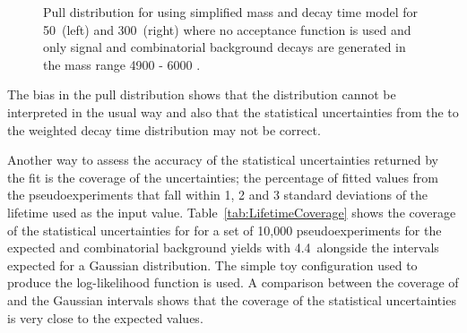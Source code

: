 {\begin{figure}[tbp]
\begin{subfigure}[b]{0.48\textwidth}
   \end{subfigure}
    \caption{Pull distribution for \tmumu using simplified mass and decay time model for 50~\fb (left) and 300~\fb (right) where no acceptance function is used and only signal and combinatorial background decays are generated in the mass range 4900 - 6000 \mevcc.}
    \label{fig:morestatstaupulls}
\end{figure}


The bias in the \tmumu pull distribution shows that the distribution cannot be interpreted in the usual way and also that the statistical uncertainties from the \ml to the weighted decay time distribution may not be correct. 

Another way to assess the accuracy of the statistical uncertainties returned by the \ml fit is the coverage of the uncertainties; the percentage of fitted \tmumu values from the pseudoexperiments that fall within 1, 2 and 3 standard deviations of the lifetime used as the input value. Table~\ref{tab:LifetimeCoverage} shows the coverage of the statistical uncertainties for \tmumu for a set of 10,000 pseudoexperiments for the expected \bsmumu and combinatorial background yields with 4.4~\fb alongside the intervals expected for a Gaussian distribution. The simple toy configuration used to produce the log-likelihood function is used. A comparison between the coverage of \tmumu and the Gaussian intervals shows that the coverage of the statistical uncertainties is very close to the expected values.

}
